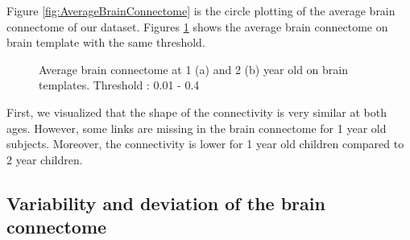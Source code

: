 \documentclass[]{spie}  %
\begin{document}
Figure \ref{fig:AverageBrainConnectome} is the circle plotting of the average brain connectome of our dataset. Figures \ref{fig:AverageBrainConnectomeBrainTemplate} shows the average brain connectome on brain template with the same threshold.

\begin{figure}
\centering 
{}
\caption[Average brain connectome at 1 (a) and 2 (b) year old on brain templates ]{Average brain connectome at 1 (a) and 2 (b) year old on brain templates. Threshold : 0.01 - 0.4}
\label{fig:AverageBrainConnectomeBrainTemplate}
\end{figure} 

First, we visualized that the shape of the connectivity is very similar at both ages. However, some links are missing in the brain connectome for 1 year old subjects. Moreover, the connectivity is lower for 1 year old children compared to 2 year children.


\subsection{Variability and deviation of the brain connectome}
\end{document}
